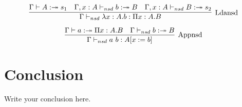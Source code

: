 \documentclass{article}
\theoremstyle{definition}
\theoremstyle{remark}
\begin{document}
\begin{equation}
    \label{simple_equation}
\infer[\mathrm{Ldansd}]
{\Gamma \vdash_{nsd} \lambda x:A.b :\Pi x:A.B}{\Gamma \vdash A :\twoheadrightarrow s_{1} & \Gamma, x:A \vdash_{nsd} b:\twoheadrightarrow B & \Gamma, x:A \vdash_{nsd} B :\twoheadrightarrow s_{2}}
\end{equation}

\begin{equation}
    \label{simple_equation}
\infer[\mathrm{Appnsd}]
{\Gamma \vdash_{nsd} a\ b : A[x:=b]}{\Gamma \vdash a :\twoheadrightarrow \Pi x:A.B & \Gamma \vdash_{nsd} b:\twoheadrightarrow B }
\end{equation}


\section{Conclusion}
Write your conclusion here.


{}

\end{document}
